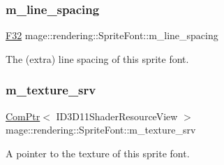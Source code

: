 \subsubsection{\texorpdfstring{m\+\_\+line\+\_\+spacing}{m\_line\_spacing}}
{\footnotesize\ttfamily \mbox{\hyperlink{namespacemage_aa97e833b45f06d60a0a9c4fc22ae02c0}{F32}} mage\+::rendering\+::\+Sprite\+Font\+::m\+\_\+line\+\_\+spacing\hspace{0.3cm}{\ttfamily [private]}}

The (extra) line spacing of this sprite font. \mbox{\label{classmage_1_1rendering_1_1_sprite_font_acdd3ca40befd9508a20011769046256e}} 
\subsubsection{\texorpdfstring{m\+\_\+texture\+\_\+srv}{m\_texture\_srv}}
{\footnotesize\ttfamily \mbox{\hyperlink{namespacemage_ae74f374780900893caa5555d1031fd79}{Com\+Ptr}}$<$ I\+D3\+D11\+Shader\+Resource\+View $>$ mage\+::rendering\+::\+Sprite\+Font\+::m\+\_\+texture\+\_\+srv\hspace{0.3cm}{\ttfamily [private]}}

A pointer to the texture of this sprite font. 